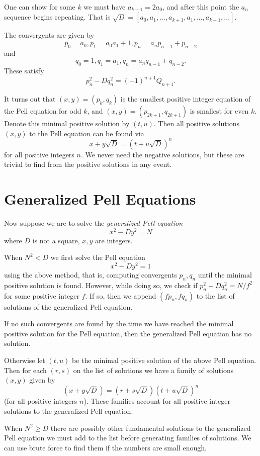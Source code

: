 One can show for some $k$ we must have $a_{k+1} = 2 a_0$, and after
this point the $a_n$ sequence begins repeating. That is
$\sqrt{D} = [a_0, a_1, ..., a_{k+1}, a_1, ..., a_{k+1}, ... ]$.

The convergents are given by
\[ p_0 = a_0, p_1 = a_0 a_1 + 1, p_n = a_n p_{n-1} + p_{n-2} \]
and
\[ q_0 = 1, q_1 = a_1, q_n = a_n q_{n-1} + q_{n-2} .\]
These satisfy
\[ p_n^2 - D q_n^2 = (-1)^{n+1} Q_{n+1} . \]

It turns out that $(x, y) = (p_k, q_k)$ is the smallest positive
integer equation
of the Pell equation for odd $k$, and $(x, y) = (p_{2k+1}, q_{2k+1})$
is smallest for even $k$. Denote this minimal positive solution by $(t, u)$.
Then all positive solutions $(x, y)$ to the Pell equation can be found via
\[ x + y\sqrt{D} = (t+u\sqrt{D})^n\]
for all positive integers $n$. We never need the negative solutions,
but these are trivial to find from the positive solutions in any event.

\section {Generalized Pell Equations}

Now suppose we are to solve the \emph{generalized Pell equation}
\[ x^2 - D y^2 = N \]
where $D$ is not a square, $x, y$ are integers.

When $N^2 < D$ we first solve the Pell equation
\[ x^2 - D y^2 = 1 \]
using the above method, that is, computing convergents $p_n, q_n$
until the minimal positive solution is found. However,
while doing so, we check if $p_n^2 - D q_n^2 = N / f^2$ for
some positive integer $f$. If so, then we append $(f p_n, f q_n)$ to
the list of solutions of the generalized Pell equation.

If no such convergents are found by the time we have reached the minimal
positive solution for the Pell equation, then the generalized Pell
equation has no solution.

Otherwise let $(t, u)$ be the minimal positive solution of the above
Pell equation.
Then for each $(r,s)$ on the list of solutions we have a family of
solutions $(x,y)$ given by
\[ (x+y\sqrt{D}) = (r+s\sqrt{D})(t+u\sqrt{D})^n \]
(for all positive integers $n$). These families account for all positive
integer solutions to the generalized Pell equation.

When $N^2 \ge D$ there are possibly other fundamental solutions
to the generalized Pell equation we must add to the list before generating
families of solutions.
We can use brute force to find them if the numbers are small enough.


